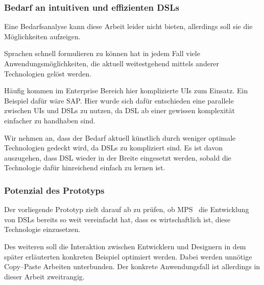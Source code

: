 \subsubsection{Bedarf an intuitiven und effizienten \aclp{DSL}}
Eine Bedarfsanalyse kann diese Arbeit leider nicht bieten, allerdings soll sie die Möglichkeiten aufzeigen.

Sprachen schnell formulieren zu können hat in jedem Fall viele Anwendungsmöglichkeiten, die aktuell weitestgehend mittels anderer Technologien gelöst werden.

Häufig kommen im Enterprise Bereich hier komplizierte \acp{UI} zum Einsatz.
Ein Beispiel dafür wäre SAP\@. %
Hier wurde sich dafür entschieden eine parallele zwischen \acp{UI} und \acp{DSL} zu nutzen, da \ac{DSL} ab einer gewissen komplexität einfacher zu handhaben sind.

Wir nehmen an, dass der Bedarf aktuell künstlich durch weniger optimale Technologien gedeckt wird, da \acp{DSL} zu kompliziert sind.
Es ist davon auszugehen, dass \ac{DSL} wieder in der Breite eingesetzt werden, sobald die Technologie dafür hinreichend einfach zu lernen ist.

\subsubsection{Potenzial des Prototyps}
Der vorliegende Prototyp zielt darauf ab zu prüfen, ob \ac{MPS}~\autocite{jetbrains-sro-2021} die Entwicklung von \acp{DSL} bereits so weit vereinfacht hat, dass es wirtschaftlich ist, diese Technologie einzusetzen.

Des weiteren soll die Interaktion zwischen Entwicklern und Designern in dem später erläuterten konkreten Beispiel optimiert werden.
Dabei werden unnötige Copy--Paste Arbeiten unterbunden.
Der konkrete Anwendungsfall ist allerdings in dieser Arbeit zweitrangig.

